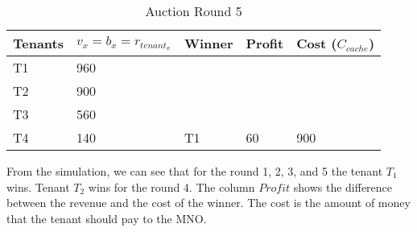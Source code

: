 \documentclass[conference]{IEEEtran}
\begin{document}
\begin{table}[htbp]
	\caption{Auction Round 5}
	\begin{tabular}{|l|l|l|l|l|}
		\hline
		\rowcolor[HTML]{C0C0C0} 
		Tenants& $v_x = b_x = r_{tenant_x}$ & Winner               & Profit                & Cost ($C_{cache}$)             \\ \hline
		T1          & 960                              &                      &                       &                        \\ \cline{1-2}
		T2          & 900                              &                      &                       &                        \\ \cline{1-2}
		T3          & 560                              &                      &                       &                        \\ \cline{1-2}
		T4          & 140                              & \multirow{-4}{*}{T1} & \multirow{-4}{*}{60} & \multirow{-4}{*}{900} \\ \hline
	\end{tabular}
\end{table}

From the simulation, we can see that for the round 1, 2, 3, and 5 the tenant $T_1$ wins. Tenant $T_2$ wins for the round 4. The column $Profit$ shows the difference between the revenue and the cost of the winner. The cost is the amount of money that the tenant should pay to the MNO.
\end{document}
